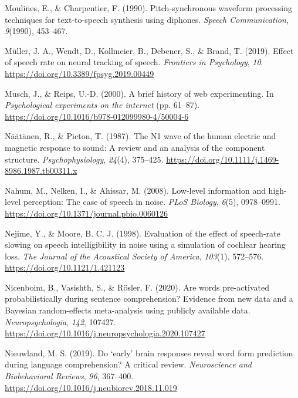 \documentclass[a4paper, nobind]{templates/ociamthesis}
\newlength{\cslhangindent}
\newenvironment{CSLReferences}[2] %
 {%
  \setlength{\parindent}{0pt}
  \ifodd #1
  \let\oldpar\par
  \def\par{\hangindent=\cslhangindent\oldpar}
  \fi
  \setlength{\parskip}{1mm}
  \setlength{\baselineskip}{6mm}
 }%
 {}
\begin{document}
\begin{CSLReferences}{1}{0}
\leavevmode{}%
Moulines, E., \& Charpentier, F. (1990). {Pitch-synchronous waveform processing techniques for text-to-speech synthesis using diphones}. \emph{Speech Communication}, \emph{9}(1990), 453--467.

\leavevmode{}%
Müller, J. A., Wendt, D., Kollmeier, B., Debener, S., \& Brand, T. (2019). {Effect of speech rate on neural tracking of speech}. \emph{Frontiers in Psychology}, \emph{10}. \url{https://doi.org/10.3389/fpsyg.2019.00449}

\leavevmode{}%
Musch, J., \& Reips, U.-D. (2000). {A brief history of web experimenting}. In \emph{Psychological experiments on the internet} (pp. 61--87). \url{https://doi.org/10.1016/b978-012099980-4/50004-6}

\leavevmode{}%
Näätänen, R., \& Picton, T. (1987). {The N1 wave of the human electric and magnetic response to sound: A review and an analysis of the component structure}. \emph{Psychophysiology}, \emph{24}(4), 375--425. \url{https://doi.org/10.1111/j.1469-8986.1987.tb00311.x}

\leavevmode{}%
Nahum, M., Nelken, I., \& Ahissar, M. (2008). {Low-level information and high-level perception: The case of speech in noise}. \emph{PLoS Biology}, \emph{6}(5), 0978--0991. \url{https://doi.org/10.1371/journal.pbio.0060126}

\leavevmode{}%
Nejime, Y., \& Moore, B. C. J. (1998). {Evaluation of the effect of speech-rate slowing on speech intelligibility in noise using a simulation of cochlear hearing loss}. \emph{The Journal of the Acoustical Society of America}, \emph{103}(1), 572--576. \url{https://doi.org/10.1121/1.421123}

\leavevmode{}%
Nicenboim, B., Vasishth, S., \& Rösler, F. (2020). Are words pre-activated probabilistically during sentence comprehension? Evidence from new data and a Bayesian random-effects meta-analysis using publicly available data. \emph{Neuropsychologia}, \emph{142}, 107427. \url{https://doi.org/10.1016/j.neuropsychologia.2020.107427}

\leavevmode{}%
Nieuwland, M. S. (2019). {Do `early' brain responses reveal word form prediction during language comprehension? A critical review}. \emph{Neuroscience and Biobehavioral Reviews}, \emph{96}, 367--400. \url{https://doi.org/10.1016/j.neubiorev.2018.11.019}


\end{CSLReferences}
\end{document}
